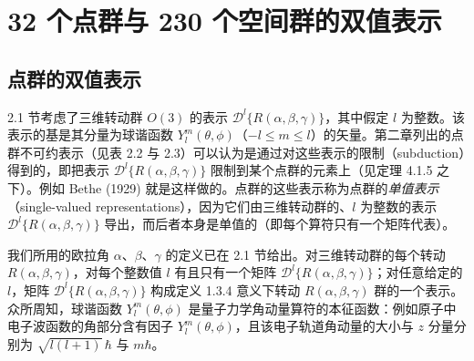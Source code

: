 \chapter{32 个点群与 230 个空间群的双值表示}

\section{点群的双值表示}

2.1 节考虑了三维转动群 $O(3)$ 的表示 $\mathcal{D}^{l}\{R(\alpha, \beta, \gamma)\}$，其中假定 $l$ 为整数。该表示的基是其分量为球谐函数 $Y^{m}_{l}(\theta, \phi)$（$-l \leqslant m \leqslant l$）的矢量。第二章列出的点群不可约表示（见表 2.2 与 2.3）可以认为是通过对这些表示的限制（subduction）得到的，即把表示 $\mathcal{D}^{l}\{R(\alpha, \beta, \gamma)\}$ 限制到某个点群的元素上（见定理 4.1.5 之下）。例如 Bethe (1929) 就是这样做的。点群的这些表示称为点群的\textit{单值表示}（single-valued representations），因为它们由三维转动群的、$l$ 为整数的表示 $\mathcal{D}^{l}\{R(\alpha, \beta, \gamma)\}$ 导出，而后者本身是单值的（即每个算符只有一个矩阵代表）。

我们所用的欧拉角 $\alpha$、$\beta$、$\gamma$ 的定义已在 2.1 节给出。对三维转动群的每个转动 $R(\alpha, \beta, \gamma)$，对每个整数值 $l$ 有且只有一个矩阵 $\mathcal{D}^{l}\{R(\alpha, \beta, \gamma)\}$；对任意给定的 $l$，矩阵 $\mathcal{D}^{l}\{R(\alpha, \beta, \gamma)\}$ 构成定义 1.3.4 意义下转动 $R(\alpha, \beta, \gamma)$ 群的一个表示。众所周知，球谐函数 $Y^{m}_{l}(\theta, \phi)$ 是量子力学角动量算符的本征函数：例如原子中电子波函数的角部分含有因子 $Y^{m}_{l}(\theta, \phi)$，且该电子轨道角动量的大小与 $z$ 分量分别为 $\sqrt{l(l+1)}\,\hbar$ 与 $m\hbar$。

